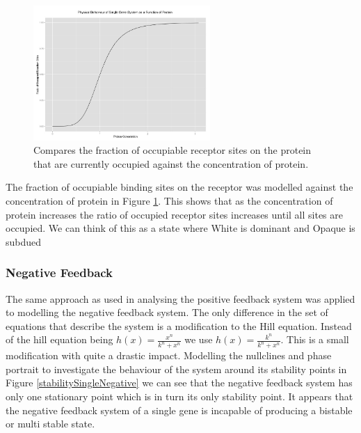 \documentclass[]{article}
\begin{document}
                    
             \begin{figure}[h]
            \centering
            \includegraphics[width=0.6\textwidth]{./figures/singlePositiveHill.jpeg}
            \caption{Compares the fraction of occupiable receptor sites on the protein that are currently occupied against the concentration of protein.}
            \label{singlePositiveHill}
            \end{figure}
    
            The fraction of occupiable binding sites on the receptor was modelled against the concentration of protein in Figure \ref{singlePositiveHill}. This shows that as the concentration of protein increases the ratio of occupied receptor sites increases until all sites are occupied. We can think of this as a state where %
            White is dominant and Opaque is subdued %
            
            \subsubsection{Negative Feedback} 
            The same approach as used in analysing the positive feedback system was applied to modelling the negative feedback system. The only difference in the set of equations that describe the system is a modification to the Hill equation. Instead of the hill equation being $h(x) = \frac{x^n}{k^n + x^n}$ we use $h(x) = \frac{k^n}{k^n+x^n}$. This is a small modification with quite a drastic impact. Modelling the nullclines and phase portrait to investigate the behaviour of the system around its stability points in Figure \ref{stabilitySingleNegative} we can see that the negative feedback system has only one stationary point which is in turn its only stability point. It appears that the negative feedback system of a single gene is incapable of producing a bistable or multi stable state.
            
\end{document}
